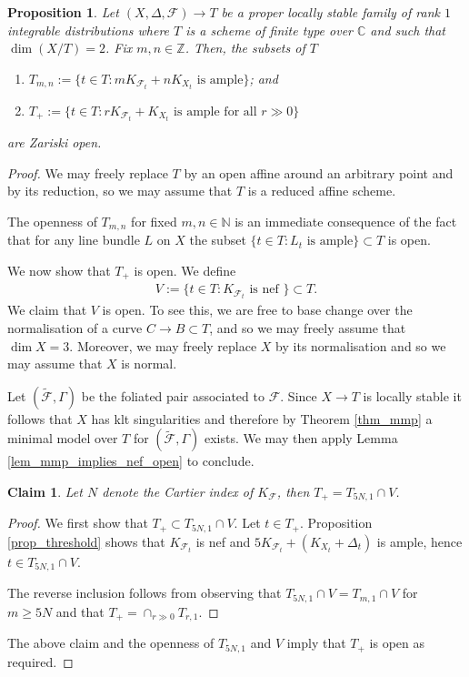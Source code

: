 \documentclass[12pt, a4paper]{amsart}
\newcounter{Theorem}
\newtheorem{proposition}[theorem]{Proposition}
\newtheorem{claim}[theorem]{Claim}
\theoremstyle{definition}
\theoremstyle{named}
\begin{document}
\begin{proposition}
\label{prop_positivity_is_open}
    Let $(X, \Delta, \mathcal F) \rightarrow T$ be a proper
    locally stable family of rank $1$ integrable distributions where $T$ is a scheme of finite type over $\mathbb C$ and such that $\dim (X/T) = 2$.
    Fix $m, n \in \mathbb Z$.
    Then, the subsets of $T$
    \begin{enumerate}
        \item $T_{m, n}  := \{t \in T : mK_{\mathcal F_t}+nK_{X_t} \text{ is ample}\}$; and 
        \item $T_+ := \{t \in T : rK_{\mathcal F_t}+K_{X_t} \text{ is ample for all } r \gg 0\}$
    \end{enumerate}
are Zariski open.
\end{proposition}
\begin{proof}
We may freely replace $T$ by an open affine around an arbitrary point and by its reduction, so we may assume that $T$ is a reduced affine scheme.

    The openness of $T_{m, n}$ for fixed $m, n \in \mathbb N$ is an immediate consequence of the fact that for any line bundle $L$ on $X$ 
    the subset $\{t \in T: L_t \text{ is ample}\}\subset T$ 
    is open.

    We now show that $T_+$ is open. 
  We define 
    \begin{align*}V := \{t \in T: K_{\mathcal F_t} \text{ is nef }\} \subset T.\end{align*}
We claim that $V$ is open.
To see this, we are free to base change over the normalisation of a 
curve $C \to B \subset T$, and so we may freely assume that $\dim X = 3$.  Moreover, we may freely replace $X$ by its normalisation
    and so we may assume that $X$ is normal.

Let $(\tilde{\mathcal F}, \Gamma)$ be the foliated pair associated to $\mathcal F$.
Since $X \rightarrow T$ is locally stable it follows that 
$X$ has klt singularities and therefore by Theorem \ref{thm_mmp} 
a minimal model over $T$ for $(\tilde{\mathcal F}, \Gamma)$ exists. 
We may then apply Lemma \ref{lem_mmp_implies_nef_open} to
conclude.

    
    \begin{claim}
     Let $N$ denote the Cartier index of $K_{\mathcal F}$, then
    $T_+ = T_{5N, 1} \cap V$.
    \end{claim}
    \begin{proof}

   We first show that $T_+ \subset T_{5N, 1}\cap V$.
Let $t \in T_+$. Proposition \ref{prop_threshold}
shows that $K_{\mathcal F_t}$ is 
nef and $5K_{\mathcal F_t}+(K_{X_t}+\Delta_t)$ is ample, hence $t \in T_{5N, 1} \cap V$.

   

   The reverse inclusion follows from observing that 
   $T_{5N, 1} \cap V = T_{m, 1} \cap V$
   for $m \geq 5N$ and that $T_+ = \cap_{r \gg 0} T_{r, 1}$.       
    \end{proof}

The above claim and the openness of $T_{5N, 1}$ and $V$ imply that $T_+$ is open as required.
 \end{proof}
\end{document}
